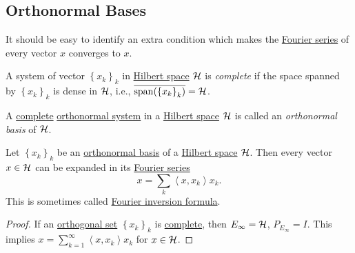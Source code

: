 \subsection{Orthonormal Bases}
It should be easy to identify an extra condition which makes the \hyperref[def:Fourier-series]{Fourier series} of every vector \(x\) converges to \(x\).

\begin{definition}\label{def:complete-system}
	A system of vector \(\left\{ x_k\right\}_k\) in \hyperref[def:Hilbert-space]{Hilbert space} \(\mathcal{\MakeUppercase{h}} \) is \emph{complete} if the space spanned by \(\left\{ x_k\right\}_k\) is dense in \(\mathcal{\MakeUppercase{h}} \), i.e., \(\overline{\mathop{\mathrm{span}}(\left\{ x_k \right\} _k)} = \mathcal{\MakeUppercase{h}} \).
\end{definition}

\begin{definition}\label{def:orthonormal-basis}
	A \hyperref[def:complete-system]{complete} \hyperref[def:orthonormal-system]{orthonormal system} in a \hyperref[def:Hilbert-space]{Hilbert space} \(\mathcal{\MakeUppercase{h}} \) is called an \emph{orthonormal basis} of \(\mathcal{\MakeUppercase{h}} \).
\end{definition}

\begin{theorem}\label{thm:Fourier-expansion}
	Let \(\left\{ x_k \right\} _k\) be an \hyperref[def:orthonormal-basis]{orthonormal basis} of a \hyperref[def:Hilbert-space]{Hilbert space} \(\mathcal{\MakeUppercase{h}} \). Then every vector \(x\in \mathcal{\MakeUppercase{h}} \) can be expanded in its \hyperref[def:Fourier-series]{Fourier series}
	\[
		x = \sum_{k} \left\langle x, x_k \right\rangle x_k.
	\]
	This is sometimes called \href{https://en.wikipedia.org/wiki/Fourier_inversion_theorem}{Fourier inversion formula}.
\end{theorem}
\begin{proof}
	If an \hyperref[def:orthogonal-system]{orthogonal set} \(\left\{ x_{k} \right\}_k \) is \hyperref[def:complete-system]{complete}, then \(E_\infty = \mathcal{\MakeUppercase{h}} \), \(P_{E_\infty } = I\). This implies \(x = \sum_{k=1}^{\infty} \left\langle x, x_{k}  \right\rangle x_{k}\) for \(x\in \mathcal{\MakeUppercase{h}} \).
\end{proof}

